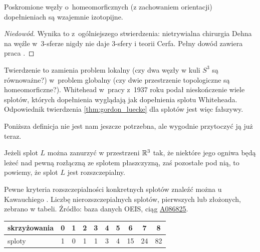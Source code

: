 \begin{theorem}
%
%
%
\label{thm:gordon_luecke}%
    Poskromione węzły o~homeomorficznych (z zachowaniem orientacji) dopełnieniach są wzajemnie izotopijne.
\end{theorem}

\begin{proof}[Niedowód]
    Wynika to z~ogólniejszego stwierdzenia: nietrywialna chirurgia Dehna na węźle w~3-sferze nigdy nie daje 3-sfery i teorii Cerfa.
%
    Pełny dowód zawiera praca \cite{gordon89}.
\end{proof}

Twierdzenie to zamienia problem lokalny (czy dwa węzły w kuli $S^3$ są równoważne?) w~problem globalny (czy dwie przestrzenie topologiczne są homeomorficzne?).
Whitehead w~pracy \cite{whitehead37} z~1937 roku podał nieskończenie wiele splotów, których dopełnienia wyglądają jak dopełnienia splotu Whiteheada.
%
Odpowiednik twierdzenia \ref{thm:gordon_luecke} dla splotów jest więc fałszywy.

Poniższa definicja nie jest nam jeszcze potrzebna, ale wygodnie przytoczyć ją już teraz.

\begin{definition}[rozszczepialność]
%
    Jeżeli splot $L$ można zanurzyć w przestrzeni $\mathbb R^3$ tak, że niektóre jego ogniwa będą leżeć nad pewną rozłączną ze splotem płaszczyzną, zaś pozostałe pod nią, to powiemy, że splot $L$ jest rozszczepialny.
\end{definition}

Pewne kryteria rozszczepialności konkretnych splotów znaleźć można u Kawauchiego \cite[s. 36-38]{kawauchi96}.
Liczbę nierozszczepialnych splotów, pierwszych lub złożonych, zebrano w tabeli.
Źródło: baza danych OEIS, ciąg \href{https://oeis.org/A086825}{A086825}.

\renewcommand*{\arraystretch}{1.4}
\footnotesize
\begin{longtable}{lccccccccc}
    \hline
    \textbf{skrzyżowania} & 0 & 1 & 2 & 3 & 4 & 5 &  6 &  7 &  8 \\ \hline \endhead
    sploty                & 1 & 0 & 1 & 1 & 3 & 4 & 15 & 24 & 82 \\
    \hline
\end{longtable}
\normalsize

